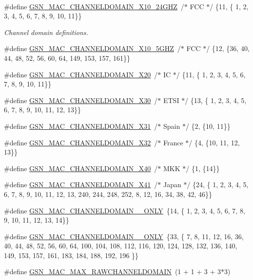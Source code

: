 \paragraph*{}
\begin{DoxyCompactItemize}
\item 
\#define \hyperlink{a00642_gadef528ef0222b55050b526f2acd1e545}{GSN\_\-MAC\_\-CHANNELDOMAIN\_\-X10\_\-24GHZ}~/$\ast$ FCC    $\ast$/ \{11, \{ 1,  2,  3,  4,  5,  6,  7,  8,  9, 10, 11\}\}
\begin{DoxyCompactList}\small\item\em Channel domain definitions. \end{DoxyCompactList}\item 
\#define \hyperlink{a00642_ga3ad89b43471f5e0ec1a3fb38092a322d}{GSN\_\-MAC\_\-CHANNELDOMAIN\_\-X10\_\-5GHZ}~/$\ast$ FCC    $\ast$/ \{12, \{36, 40, 44, 48, 52, 56, 60, 64, 149, 153, 157, 161\}\}
\item 
\#define \hyperlink{a00642_gad25876d674bda6a842556d3b3194ab50}{GSN\_\-MAC\_\-CHANNELDOMAIN\_\-X20}~/$\ast$ IC     $\ast$/ \{11, \{ 1,  2,  3,  4,  5,  6,  7,  8,  9, 10, 11\}\}
\item 
\#define \hyperlink{a00642_ga9bdd8d819efafbf6ee3f9a9372b8b4ab}{GSN\_\-MAC\_\-CHANNELDOMAIN\_\-X30}~/$\ast$ ETSI   $\ast$/ \{13, \{ 1,  2,  3,  4,  5,  6,  7,  8,  9, 10, 11, 12, 13\}\}
\item 
\#define \hyperlink{a00642_ga2fa52e7994dae2b65aa764cebd4b08a6}{GSN\_\-MAC\_\-CHANNELDOMAIN\_\-X31}~/$\ast$ Spain  $\ast$/ \{2,  \{10, 11\}\}
\item 
\#define \hyperlink{a00642_ga674bc6383fba8ff146b4741af9ed8494}{GSN\_\-MAC\_\-CHANNELDOMAIN\_\-X32}~/$\ast$ France $\ast$/ \{4,  \{10, 11, 12, 13\}\}
\item 
\#define \hyperlink{a00642_ga28a20ad2b2d714e7729976e3778428a0}{GSN\_\-MAC\_\-CHANNELDOMAIN\_\-X40}~/$\ast$ MKK    $\ast$/ \{1,  \{14\}\}
\item 
\#define \hyperlink{a00642_gacb2f3c46d39cb7547bf13a2cf2da53c6}{GSN\_\-MAC\_\-CHANNELDOMAIN\_\-X41}~/$\ast$ Japan  $\ast$/ \{24, \{ 1,  2,  3,  4,  5,  6,  7,  8,  9, 10, 11, 12, 13, 240, 244, 248, 252, 8, 12, 16, 34, 38, 42, 46\}\}
\item 
\#define \hyperlink{a00642_ga1902c2b82dd9530b1f76e7aa03cad775}{GSN\_\-MAC\_\-CHANNELDOMAIN\_\_\-ONLY}~\{14, \{ 1,  2,  3,  4,  5,  6,  7,  8,  9, 10, 11, 12, 13, 14\}\}
\item 
\#define \hyperlink{a00642_ga700daf355821d5d26cb0d2f346a1a969}{GSN\_\-MAC\_\-CHANNELDOMAIN\_\_\-ONLY}~\{33, \{ 7,  8, 11, 12, 16, 36, 40, 44, 48, 52, 56, 60, 64, 100, 104, 108, 112, 116, 120, 124, 128, 132, 136, 140, 149, 153, 157, 161, 183, 184, 188, 192, 196 \}\}
\item 
\#define \hyperlink{a00642_gab2030e7c4ab461cd034d5ee1ef004372}{GSN\_\-MAC\_\-MAX\_\-RAWCHANNELDOMAIN}~(1 + 1 + 3 + 3$\ast$3)
\end{DoxyCompactItemize}

